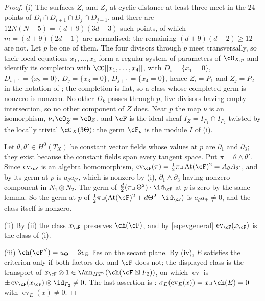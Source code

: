 \begin{proof}
(i) The surfaces $Z_{i}$ and $Z_{j}$ at cyclic distance at least three meet
in the $24$ points of $D_{i}\cap D_{i+1}\cap D_{j}\cap D_{j+1}$, and there are
$12N(N-5)=(d+9)(3d-3)$ such points, of which $m=(d+9)(2d-1)$ are normalised;
the remaining $(d+9)(d-2)\ge12$ are not. Let $p$ be one of them. The four
divisors through $p$ meet transversally, so their local equations
$x_{1},\dots,x_{4}$ form a regular system of parameters of $\cO_{X,p}$ and
identify its completion with $\CC[[x_{1},\dots,x_{4}]]$, with
$D_{i}=\{x_{1}=0\}$, $D_{i+1}=\{x_{2}=0\}$, $D_{j}=\{x_{3}=0\}$,
$D_{j+1}=\{x_{4}=0\}$, hence $Z_{i}=P_{1}$ and $Z_{j}=P_{2}$ in the
notation of ; the completion is flat, so a class
whose completed germ is nonzero is nonzero. No other
$D_{k}$ passes through $p$, five divisors having empty intersection, so no
other component of $Z$ does. Near $p$ the map $\nu$ is an isomorphism,
$\nu_{*}\cO_{\widetilde Z}=\cO_{Z}$, and $\cF$ is the ideal sheaf
$I_{Z}=I_{P_{1}}\cap I_{P_{2}}$ twisted by the locally trivial $\cO_{X}(3\Theta)$:
the germ $\cF_{p}$ is the module $I$ of (i).

Let $\theta,\theta'\in H^{0}(T_{X})$ be constant vector fields whose values
at $p$ are $\partial_{1}$ and $\partial_{3}$; they exist because the constant
fields span every tangent space. Put $\pi=\theta\wedge\theta'$. Since
$\operatorname{ev}_{\cF}$ is an algebra homomorphism,
$\operatorname{ev}_{\cF}(\pi)=\tfrac12\pi\lrcorner\,\mathrm{At}(\cF)^{2}
=A_{\theta}A_{\theta'}$, and by  its germ at $p$ is
$a_{\theta}a_{\theta'}$, which is nonzero by (i),
$\partial_{1}\wedge\partial_{3}$ having nonzero component in $N_{1}\otimes N_{2}$.
The germ of $\tfrac d2(\pi\lrcorner\,\Theta^{2})\cdot\id_{\cF}$ at $p$ is zero
by the same lemma. So the germ at $p$ of
$\tfrac12\pi\lrcorner(\mathrm{At}(\cF)^{2}+d\Theta^{2}\cdot\id_{\cF})$ is
$a_{\theta}a_{\theta'}\ne0$, and the class itself is nonzero.

(ii) By (ii) the class $x_{\cF}$ preserves $\ch(\cF)$, and by
\eqref{eq:evgeneral} $\operatorname{ev}_{\cF}(x_{\cF})$ is the class of (i).

(iii) $\ch(\cF^{\vee})=u_{\Theta}-3v_{\Theta}$ lies on the secant plane. By
(iv), $E$ satisfies the criterion only if both factors do,
and $\cF$ does not; the displayed class is the transport of
$x_{\cF}\otimes1\in\Ann_{HT^{2}}(\ch(\cF\boxtimes F_{2}))$, on which
$\operatorname{ev}$ is $\pm\operatorname{ev}_{\cF}(x_{\cF})\otimes\id_{F_{2}}\ne0$.
The last assertion is :
$\sigma_{E}(\operatorname{ev}_{E}(x))=x\lrcorner\,\ch(E)=0$ with
$\operatorname{ev}_{E}(x)\ne0$.
\end{proof}

